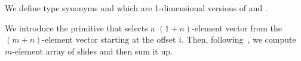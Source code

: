 We define type synonyms  and  which are 1-dimensional versions
of  and .
We introduce the  primitive that selects a $(1+n)$-element vector
from the $(m+n)$-element vector starting at the offset $i$.  Then,
following~\cite{cnn-array}, we compute $m$-element array of slides
and then sum it up.
